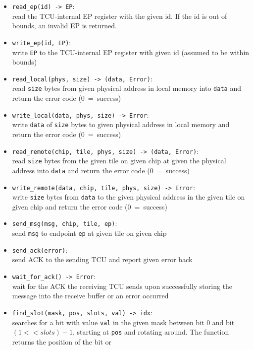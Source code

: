 \begin{itemize}
  \item \texttt{read\_ep(id) -> EP}:\\
  read the TCU-internal EP register with the given id. If the id is out of bounds, an invalid EP is
  returned.
  \item \texttt{write\_ep(id, EP)}:\\
  write \texttt{EP} to the TCU-internal EP register with given id (assumed to be within bounds)
  \item \texttt{read\_local(phys, size) -> (data, Error)}:\\
  read \texttt{size} bytes from given physical address in local memory into \texttt{data} and
  return the error code (0~=~success)
  \item \texttt{write\_local(data, phys, size) -> Error}:\\
  write \texttt{data} of \texttt{size} bytes to given physical address in local memory and
  return the error code (0~=~success)
  \item \texttt{read\_remote(chip, tile, phys, size) -> (data, Error)}:\\
  read \texttt{size} bytes from the given tile on given chip at given the physical address into
  \texttt{data} and return the error code (0~=~success)
  \item \texttt{write\_remote(data, chip, tile, phys, size) -> Error}:\\
  write \texttt{size} bytes from \texttt{data} to the given physical address in the given tile on
  given chip and return the error code (0~=~success)
  \item \texttt{send\_msg(msg, chip, tile, ep)}:\\
  send \texttt{msg} to endpoint \texttt{ep} at given tile on given chip
  \item \texttt{send\_ack(error)}:\\
  send ACK to the sending TCU and report given error back
  \item \texttt{wait\_for\_ack() -> Error}:\\
  wait for the ACK the receiving TCU sends upon successfully storing the message into the receive
  buffer or an error occurred
  \item \texttt{find\_slot(mask, pos, slots, val) -> idx}:\\
  searches for a bit with value \texttt{val} in the given mask between bit 0 and bit $(1 << slots) -
  1$, starting at \texttt{pos} and rotating around. The function returns the position of the bit or

\end{itemize}
